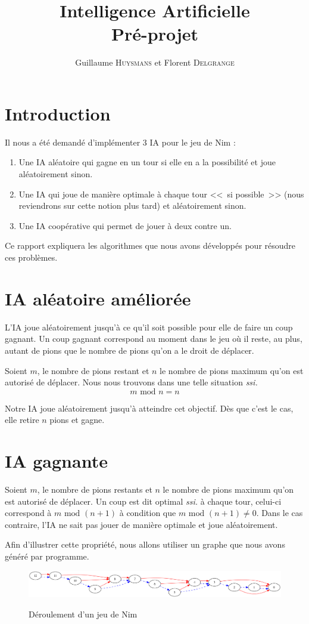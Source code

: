 \documentclass[10pt,a4paper]{article}
\author{Guillaume \textsc{Huysmans} et Florent \textsc{Delgrange}}
\title{Intelligence Artificielle\\Pré-projet}
\newcommand{\ssi}{\textit{ssi. }}
\renewcommand{\mod}{\text{ mod }}
\begin{document}
\maketitle
\section{Introduction}
Il nous a été demandé d'implémenter 3 IA pour le jeu de Nim :
\begin{enumerate}
\item Une IA aléatoire qui gagne en un tour si elle en a la possibilité et joue
	aléatoirement sinon.
\item Une IA qui joue de manière optimale à chaque tour <<~si possible~>>
	(nous reviendrons sur cette notion plus tard) et aléatoirement sinon.
\item Une IA coopérative qui permet de jouer à deux contre un.
\end{enumerate}

Ce rapport expliquera les algorithmes que nous avons développés
pour résoudre ces problèmes.

\section{IA aléatoire améliorée}
L'IA joue aléatoirement jusqu'à ce qu'il soit possible pour elle de faire un
coup gagnant. Un coup gagnant correspond au moment dans le jeu où il reste, au
plus, autant de pions que le nombre de pions qu'on a le droit de déplacer.

Soient $m$, le nombre de pions restant et $n$ le nombre de pions maximum qu'on
est autorisé de déplacer. Nous nous trouvons dans une telle situation \ssi
\[m \mod n = n\]

Notre IA joue aléatoirement jusqu'à atteindre cet objectif.
Dès que c'est le cas, elle retire $n$ pions et gagne.

\section{IA gagnante}
Soient $m$, le nombre de pions restants et $n$ le nombre de pions maximum qu'on
est autorisé de déplacer. Un coup est dit optimal \ssi à chaque tour,
celui-ci correspond à $m \mod (n+1)$ à condition que $m \mod (n+1) \neq 0$.
Dans le cas contraire, l'IA ne sait pas jouer de manière optimale et joue
aléatoirement.

Afin d'illustrer cette propriété, nous allons utiliser un
graphe que nous avons généré par programme.
\begin{figure}
	\center
\includegraphics[width=\textwidth]{nim.png}
\label{nim12}
\caption{Déroulement d'un jeu de Nim}
\end{figure}
\end{document}
